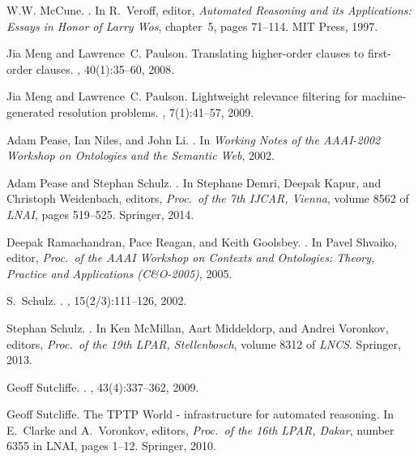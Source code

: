 \documentclass{article}
\begin{document}
\begin{thebibliography}{10}
W.W. McCune.
.
\newblock In R.~Veroff, editor, {\em Automated Reasoning and its Applications:
  Essays in Honor of Larry Wos}, chapter~5, pages 71--114. MIT Press, 1997.

Jia Meng and Lawrence~C. Paulson.
\newblock Translating higher-order clauses to first-order clauses.
, 40(1):35--60, 2008.

Jia Meng and Lawrence~C. Paulson.
\newblock Lightweight relevance filtering for machine-generated resolution
  problems.
, 7(1):41--57, 2009.

Adam Pease, Ian Niles, and John Li.
.
\newblock In {\em Working Notes of the AAAI-2002 Workshop on Ontologies and the
  Semantic Web}, 2002.

Adam Pease and Stephan Schulz.
.
\newblock In Stephane Demri, Deepak Kapur, and Christoph Weidenbach, editors,
  {\em Proc.\ of the 7th IJCAR, Vienna}, volume 8562 of {\em LNAI}, pages
  519--525. Springer, 2014.

Deepak Ramachandran, Pace Reagan, and Keith Goolsbey.
.
\newblock In Pavel Shvaiko, editor, {\em Proc.\ of the AAAI Workshop on
  Contexts and Ontologies: Theory, Practice and Applications (C\&O-2005)},
  2005.

S.~Schulz.
.
, 15(2/3):111--126, 2002.

Stephan Schulz.
.
\newblock In Ken McMillan, Aart Middeldorp, and Andrei Voronkov, editors, {\em
  Proc.\ of the 19th LPAR, Stellenbosch}, volume 8312 of {\em LNCS}. Springer,
  2013.

Geoff Sutcliffe.
.
, 43(4):337--362, 2009.

Geoff Sutcliffe.
\newblock The {TPTP World} - infrastructure for automated reasoning.
\newblock In E.~Clarke and A.~Voronkov, editors, {\em {Proc.\ of the 16th LPAR,
  Dakar}}, number 6355 in LNAI, pages 1--12. Springer, 2010.


\end{thebibliography}
\end{document}

